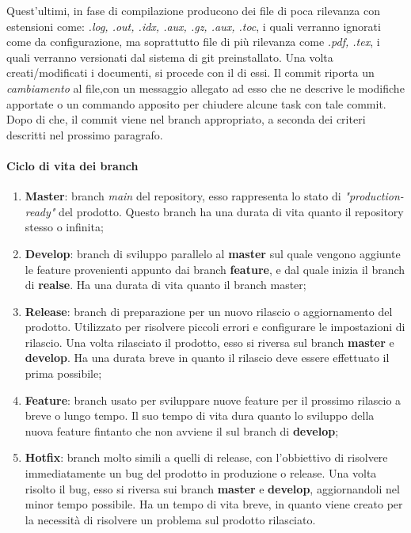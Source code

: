 %

Quest'ultimi, in fase di compilazione producono dei file di poca rilevanza con estensioni come: \textit{.log, .out, .idx, .aux, .gz, .aux, .toc},
i quali verranno ignorati come da configurazione, ma soprattutto file di più rilevanza
come \textit{.pdf, .tex}, i quali verranno versionati dal sistema di git preinstallato.  
Una volta creati/modificati i documenti, si procede con il  di essi. Il commit riporta un \textit{cambiamento} al file,con un messaggio allegato ad esso che ne 
descrive le modifiche apportate o un commando apposito per chiudere alcune task con tale commit. Dopo di che, il commit viene  nel branch appropriato, 
a seconda dei criteri descritti nel prossimo paragrafo. 

\paragraph{Ciclo di vita dei branch}
\begin{enumerate}
	
	\item \textbf{Master}: branch \textit{main} del repository, esso rappresenta lo stato di \textit{"production-ready"} del prodotto. Questo branch ha una durata di vita quanto il repository stesso o infinita;
	\item \textbf{Develop}: branch di sviluppo parallelo al \textbf{master} sul quale vengono aggiunte le feature provenienti appunto dai branch \textbf{feature},
	 e dal quale inizia il branch di \textbf{realse}. Ha una durata di vita quanto il branch master;
	 
	\item \textbf{Release}: branch di preparazione per un nuovo rilascio o aggiornamento del prodotto. 
	Utilizzato per risolvere piccoli errori e configurare le impostazioni di rilascio. Una volta rilasciato il 
	prodotto, esso si riversa sul branch \textbf{master} e \textbf{develop}. Ha una durata breve in quanto il rilascio deve essere effettuato il prima possibile;

	\item \textbf{Feature}: branch usato per sviluppare nuove feature per il prossimo rilascio a breve o lungo tempo. Il suo tempo di vita dura quanto lo sviluppo della nuova feature
	fintanto che non avviene il  sul branch di \textbf{develop};

	\item \textbf{Hotfix}: branch molto simili a quelli di release, con l'obbiettivo di risolvere immediatamente un bug del prodotto in produzione o release. Una volta risolto il bug, 
	esso si riversa sui branch \textbf{master} e \textbf{develop}, aggiornandoli nel minor tempo possibile. Ha un tempo di vita breve, in quanto viene creato per la necessità di risolvere 
	un problema sul prodotto rilasciato. 
	
\end{enumerate}

